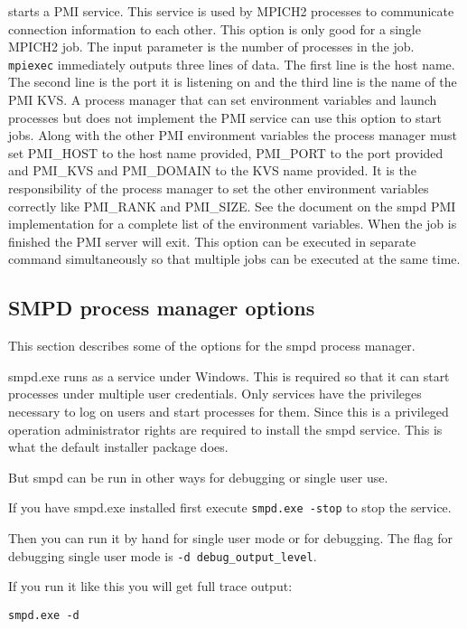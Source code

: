 \documentclass[dvipdfm,11pt]{article}
\begin{document}
\begin{itemize}
starts a PMI service.  This service is used by MPICH2 processes to communicate
connection information to each other.  This option is only good for a single
MPICH2 job.  The input parameter is the number of processes in the job.
\texttt{mpiexec} immediately outputs three lines of data.  The first line is the
host name.  The second line is the port it is listening on and the third line
is the name of the PMI KVS.  A process manager that can set environment variables
and launch processes but does not implement the PMI service can use this option
to start jobs.  Along with the other PMI environment variables the process 
manager must set PMI\_HOST to the host name provided, PMI\_PORT to the port
provided and PMI\_KVS and PMI\_DOMAIN to the KVS name provided.  It is the 
responsibility of the process manager to set the other environment variables
correctly like PMI\_RANK and PMI\_SIZE.  See the document on the smpd PMI implementation
for a complete list of the environment variables.  When the job is finished the
PMI server will exit.  This option can be executed in separate command simultaneously
so that multiple jobs can be executed at the same time.
\end{itemize}

\subsection{SMPD process manager options}
This section describes some of the options for the smpd process manager.

smpd.exe runs as a service under Windows.  This is required so that it can start
processes under multiple user credentials.  Only services have the privileges
necessary to log on users and start processes for them.  Since this is a privileged
operation administrator rights are required to install the smpd service.  This is
what the default installer package does.

But smpd can be run in other ways for debugging or single user use.

If you have smpd.exe installed first execute \texttt{smpd.exe -stop} to stop the
service.

Then you can run it by hand for single user mode or for debugging.  The flag for
debugging single user mode is \texttt{-d debug\_output\_level}.

If you run it like this you will get full trace output:
\begin{verbatim}
smpd.exe -d
\end{verbatim}
\end{document}
